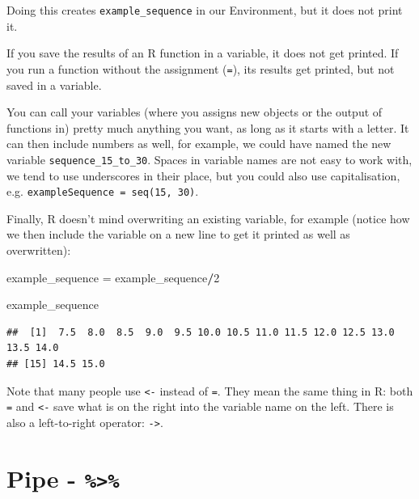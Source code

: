 \documentclass[12pt,]{krantz}
\makeatletter
\newenvironment{Shaded}{\begin{snugshade}}{\end{snugshade}}
\newcommand{\DecValTok}[1]{\textcolor[rgb]{0.00,0.00,0.81}{#1}}
\newcommand{\NormalTok}[1]{#1}
\newcommand{\OperatorTok}[1]{\textcolor[rgb]{0.81,0.36,0.00}{\textbf{#1}}}
\newcommand{\StringTok}[1]{\textcolor[rgb]{0.31,0.60,0.02}{#1}}
\renewenvironment{quote}{\begin{VF}}{\end{VF}}
\newenvironment{kframe}{%
\medskip{}
\setlength{\fboxsep}{.8em}
 \def\at@end@of@kframe{}%
 \ifinner\ifhmode%
  \def\at@end@of@kframe{\end{minipage}}%
  \begin{minipage}{\columnwidth}%
 \fi\fi%
 \def\FrameCommand##1{\hskip\@totalleftmargin \hskip-\fboxsep
 \colorbox{shadecolor}{##1}\hskip-\fboxsep
     \hskip-\linewidth \hskip-\@totalleftmargin \hskip\columnwidth}%
 \MakeFramed {\advance\hsize-\width
   \@totalleftmargin\z@ \linewidth\hsize
   \@setminipage}}%
 {\par\unskip\endMakeFramed%
 \at@end@of@kframe}
\renewenvironment{Shaded}{\begin{kframe}}{\end{kframe}}
\theoremstyle{definition}
\theoremstyle{definition}
\theoremstyle{definition}
\theoremstyle{remark}
\makeatother
\begin{document}
Doing this creates \texttt{example\_sequence} in our Environment, but it
does not print it.

\begin{quote}
If you save the results of an R function in a variable, it does not get
printed. If you run a function without the assignment (\texttt{=}), its
results get printed, but not saved in a variable.
\end{quote}

You can call your variables (where you assigns new objects or the output
of functions in) pretty much anything you want, as long as it starts
with a letter. It can then include numbers as well, for example, we
could have named the new variable \texttt{sequence\_15\_to\_30}. Spaces
in variable names are not easy to work with, we tend to use underscores
in their place, but you could also use capitalisation, e.g.
\texttt{exampleSequence\ =\ seq(15,\ 30)}.

Finally, R doesn't mind overwriting an existing variable, for example
(notice how we then include the variable on a new line to get it printed
as well as overwritten):

\begin{Shaded}
\begin{Highlighting}[]
\NormalTok{example_sequence =}\StringTok{ }\NormalTok{example_sequence}\OperatorTok{/}\DecValTok{2}

\NormalTok{example_sequence}
\end{Highlighting}
\end{Shaded}

\begin{verbatim}
##  [1]  7.5  8.0  8.5  9.0  9.5 10.0 10.5 11.0 11.5 12.0 12.5 13.0 13.5 14.0
## [15] 14.5 15.0
\end{verbatim}

\begin{quote}
Note that many people use \texttt{\textless{}-} instead of \texttt{=}.
They mean the same thing in R: both \texttt{=} and \texttt{\textless{}-}
save what is on the right into the variable name on the left. There is
also a left-to-right operator: \texttt{-\textgreater{}}.
\end{quote}

\hypertarget{pipe--}{%
\section{\texorpdfstring{Pipe -
\texttt{\%\textgreater{}\%}}{Pipe - \%\textgreater{}\%}}\label{pipe--}}
\end{document}

